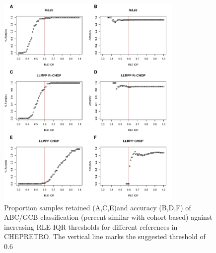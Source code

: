 \documentclass{article}
\begin{document}
\begin{figure}
	\begin{center}
		\includegraphics[width=0.8\textwidth]{figures/chep_rle_classification_abcgcb.pdf}
	\end{center}
	\caption{Proportion samples retained (A,C,E)and accuracy (B,D,F) of ABC/GCB classification (percent similar with cohort based) against increasing RLE IQR thresholds for different references in CHEPRETRO. The vertical line marks the suggested threshold of 0.6}
	\label{fig:chep_rle_clas_abcgcb}
\end{figure}
\end{document}
